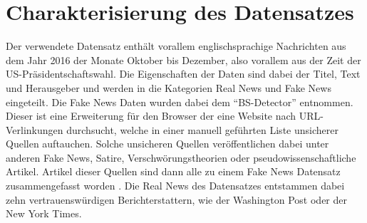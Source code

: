 \section{Charakterisierung des Datensatzes}
Der verwendete Datensatz \cite{real_data} enthält vorallem englischsprachige Nachrichten aus dem Jahr 
2016 der Monate Oktober bis Dezember, also vorallem aus der Zeit der US-Präsidentschaftswahl.
Die Eigenschaften der Daten sind dabei der Titel, Text und Herausgeber und werden in die Kategorien 
Real News und Fake News eingeteilt. Die Fake News Daten wurden dabei dem 
\enquote{BS-Detector} \cite{BS} entnommen. Dieser ist eine Erweiterung für den Browser 
der eine Website nach URL-Verlinkungen durchsucht, welche in einer manuell geführten 
Liste unsicherer Quellen auftauchen. Solche unsicheren Quellen veröffentlichen dabei unter anderen 
Fake News, Satire, Verschwörungstheorien oder pseudowissenschaftliche Artikel. Artikel dieser Quellen 
sind dann alle zu einem Fake News Datensatz zusammengefasst worden \cite{fake_data}. Die 
Real News des Datensatzes entstammen dabei zehn vertrauenswürdigen Berichterstattern, wie der 
Washington Post oder der New York Times.